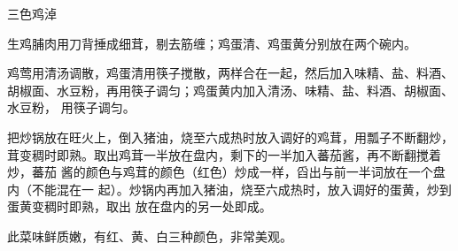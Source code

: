 %
%
%
%
%
%
%
\begin{recipe}{三色鸡淖}

\ingredients


\preparation

\step 生鸡脯肉用刀背捶成细茸，剔去筋缠；鸡蛋清、鸡蛋黄分别放在两个碗内。

\step 鸡莺用清汤调散，鸡蛋清用筷子搅散，两样合在一起，然后加入味精、盐、料酒、
胡椒面、水豆粉，再用筷子调匀；鸡蛋黄内加入清汤、味精、盐、料酒、胡椒面、水豆粉，
用筷子调匀。

\step 把炒锅放在旺火上，倒入猪油，烧至六成热时放入调好的鸡茸，用瓢子不断翻炒，
茸变稠时即熟。取出鸡茸一半放在盘内，剩下的一半加入蕃茄酱，再不断翻搅着炒，蕃茄
酱的颜色与鸡茸的颜色（红色）炒成一样，舀出与前一半词放在一个盘内（不能混在一
起）。炒锅内再加入猪油，烧至六成热时，放入调好的蛋黄，炒到蛋黄变稠时即熟，取出
放在盘内的另一处即成。

\features

此菜味鲜质嫩，有红、黄、白三种颜色，非常美观。

\end{recipe}

